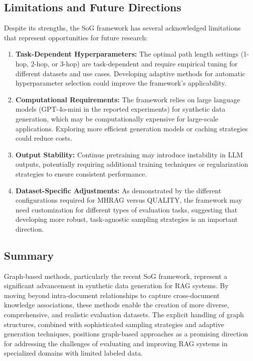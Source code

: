 \documentclass[11pt,a4paper]{article}
\begin{document}
\subsection{Limitations and Future Directions}

Despite its strengths, the SoG framework has several acknowledged limitations that represent opportunities for future research:

\begin{enumerate}
    \item \textbf{Task-Dependent Hyperparameters:} The optimal path length settings (1-hop, 2-hop, or 3-hop) are task-dependent and require empirical tuning for different datasets and use cases. Developing adaptive methods for automatic hyperparameter selection could improve the framework's applicability.
    
    \item \textbf{Computational Requirements:} The framework relies on large language models (GPT-4o-mini in the reported experiments) for synthetic data generation, which may be computationally expensive for large-scale applications. Exploring more efficient generation models or caching strategies could reduce costs.
    
    \item \textbf{Output Stability:} Continue pretraining may introduce instability in LLM outputs, potentially requiring additional training techniques or regularization strategies to ensure consistent performance.
    
    \item \textbf{Dataset-Specific Adjustments:} As demonstrated by the different configurations required for MHRAG versus QUALITY, the framework may need customization for different types of evaluation tasks, suggesting that developing more robust, task-agnostic sampling strategies is an important direction.
\end{enumerate}

\subsection{Summary}

Graph-based methods, particularly the recent SoG framework, represent a significant advancement in synthetic data generation for RAG systems. By moving beyond intra-document relationships to capture cross-document knowledge associations, these methods enable the creation of more diverse, comprehensive, and realistic evaluation datasets. The explicit handling of graph structures, combined with sophisticated sampling strategies and adaptive generation techniques, positions graph-based approaches as a promising direction for addressing the challenges of evaluating and improving RAG systems in specialized domains with limited labeled data.
\end{document}
